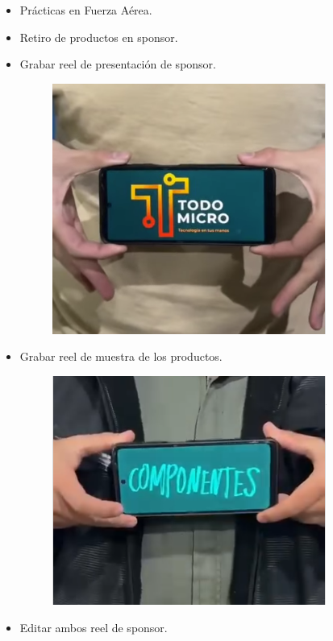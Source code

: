 \documentclass[12pt,a4paper]{article}
\begin{document}
\begin{itemize}
\item Prácticas en Fuerza Aérea. 
\item Retiro de productos en sponsor.

\item Grabar reel de presentación de sponsor.
\begin{figure}[H]
    \centering
    \includegraphics[width=0.75\linewidth]{Carpeta de campo/Reel sponsor.png}
\end{figure}
\item Grabar reel de muestra de los productos.
\begin{figure}[H]
    \centering
    \includegraphics[width=0.75\linewidth]{Carpeta de campo/reelcomp.png}
\end{figure}
\item Editar ambos reel de sponsor.
\end{itemize}
\end{document}
